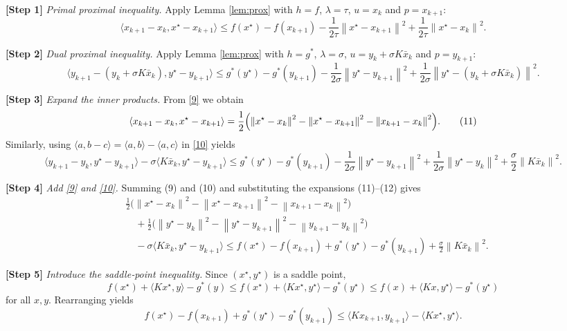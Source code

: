 \documentclass{article}
\newcommand{\inner}[2]{\langle #1,#2\rangle}
\newcommand{\norm}[1]{\left\|#1\right\|}
\begin{document}
\noindent\textbf{[Step 1]} \emph{Primal proximal inequality.}  
Apply Lemma \ref{lem:prox} with $h=f$, $\lambda=\tau$, $u=x_{k}$ and $p=x_{k+1}$:
\[
\inner{x_{k+1}-x_{k}}{x^{\star}-x_{k+1}}
\le
f(x^{\star})-f(x_{k+1})
-\frac{1}{2\tau}\norm{x^{\star}-x_{k+1}}^{2}
+\frac{1}{2\tau}\norm{x^{\star}-x_{k}}^{2}.
\tag{9}
\]

\noindent\textbf{[Step 2]} \emph{Dual proximal inequality.}  
Apply Lemma \ref{lem:prox} with $h=g^{*}$, $\lambda=\sigma$, $u=y_{k}+\sigma K\bar x_{k}$ and $p=y_{k+1}$:
\[
\inner{y_{k+1}-(y_{k}+\sigma K\bar x_{k})}{y^{\star}-y_{k+1}}
\le
g^{*}(y^{\star})-g^{*}(y_{k+1})
-\frac{1}{2\sigma}\norm{y^{\star}-y_{k+1}}^{2}
+\frac{1}{2\sigma}\norm{y^{\star}-(y_{k}+\sigma K\bar x_{k})}^{2}.
\tag{10}
\]

\noindent\textbf{[Step 3]} \emph{Expand the inner products.}  
From \eqref{9} we obtain
\[
\inner{x_{k+1}-x_{k}}{x^{\star}-x_{k+1}}
=
\frac{1}{2}\Bigl(\norm{x^{\star}-x_{k}}^{2}
-\norm{x^{\star}-x_{k+1}}^{2}
-\norm{x_{k+1}-x_{k}}^{2}\Bigr).
\tag{11}
\]
Similarly, using $\inner{a}{b-c}=\inner{a}{b}-\inner{a}{c}$ in \eqref{10} yields
\[
\inner{y_{k+1}-y_{k}}{y^{\star}-y_{k+1}}
-\sigma\inner{K\bar x_{k}}{y^{\star}-y_{k+1}}
\le
g^{*}(y^{\star})-g^{*}(y_{k+1})
-\frac{1}{2\sigma}\norm{y^{\star}-y_{k+1}}^{2}
+\frac{1}{2\sigma}\norm{y^{\star}-y_{k}}^{2}
+\frac{\sigma}{2}\norm{K\bar x_{k}}^{2}.
\tag{12}
\]

\noindent\textbf{[Step 4]} \emph{Add \eqref{9} and \eqref{10}.}  
Summing (9) and (10) and substituting the expansions (11)–(12) gives
\[
\begin{aligned}
&\frac{1}{2}\bigl(\norm{x^{\star}-x_{k}}^{2}
-\norm{x^{\star}-x_{k+1}}^{2}
-\norm{x_{k+1}-x_{k}}^{2}\bigr)\\
&\quad+\frac{1}{2}\bigl(\norm{y^{\star}-y_{k}}^{2}
-\norm{y^{\star}-y_{k+1}}^{2}
-\norm{y_{k+1}-y_{k}}^{2}\bigr)\\
&\quad-\sigma\inner{K\bar x_{k}}{y^{\star}-y_{k+1}}
\le
f(x^{\star})-f(x_{k+1})
+g^{*}(y^{\star})-g^{*}(y_{k+1})
+\frac{\sigma}{2}\norm{K\bar x_{k}}^{2}.
\end{aligned}
\tag{13}
\]

\noindent\textbf{[Step 5]} \emph{Introduce the saddle‑point inequality.}  
Since $(x^{\star},y^{\star})$ is a saddle point,
\[
f(x^{\star})+ \inner{Kx^{\star}}{y} - g^{*}(y)
\le
f(x^{\star})+ \inner{Kx^{\star}}{y^{\star}} - g^{*}(y^{\star})
\le
f(x)+ \inner{Kx}{y^{\star}} - g^{*}(y^{\star})
\]
for all $x,y$. Rearranging yields
\[
f(x^{\star})-f(x_{k+1})+g^{*}(y^{\star})-g^{*}(y_{k+1})
\le
\inner{Kx_{k+1}}{y_{k+1}}-\inner{Kx^{\star}}{y^{\star}}.
\tag{14}
\]
\end{document}
